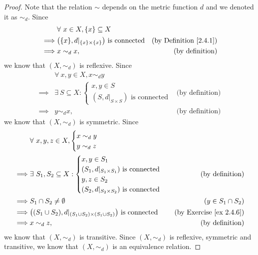 \begin{proof}
    Note that the relation \(\sim\) depends on the metric function \(d\) and we denoted it as \(\sim_d\).
    Since
    \begin{align*}
                 & \forall\ x \in X, \{x\} \subseteq X                                                                \\
        \implies & \big(\{x\}, d|_{\{x\} \times \{x\}}\big) \text{ is connected} & \text{(by Definition \ref{2.4.1})} \\
        \implies & x \sim_d x,                                                   & \text{(by definition)}
    \end{align*}
    we know that \((X, \sim_d)\) is reflexive.
    Since
    \begin{align*}
                 & \forall\ x, y \in X, x \sim_d y                                              \\
        \implies & \exists\ S \subseteq X : \begin{cases}
            x, y \in S \\
            (S, d|_{S \times S}) \text{ is connected}
        \end{cases} & \text{(by definition)} \\
        \implies & y \sim_d x,                                         & \text{(by definition)}
    \end{align*}
    we know that \((X, \sim_d)\) is symmetric.
    Since
    \begin{align*}
                 & \forall\ x, y, z \in X, \begin{cases}
            x \sim_d y \\
            y \sim_d z
        \end{cases}                                                                             \\
        \implies & \exists\ S_1, S_2 \subseteq X : \begin{cases}
            x, y \in S_1                                    \\
            (S_1, d|_{S_1 \times S_1}) \text{ is connected} \\
            y, z \in S_2                                    \\
            (S_2, d|_{S_2 \times S_2}) \text{ is connected}
        \end{cases}                               & \text{(by definition)}              \\
        \implies & S_1 \cap S_2 \neq \emptyset                                                              & (y \in S_1 \cap S_2)                \\
        \implies & \big((S_1 \cup S_2), d|_{(S_1 \cup S_2) \times (S_1 \cup S_2)}\big) \text{ is connected} & \text{(by Exercise \ref{ex 2.4.6})} \\
        \implies & x \sim_d z,                                                                              & \text{(by definition)}
    \end{align*}
    we know that \((X, \sim_d)\) is transitive.
    Since \((X, \sim_d)\) is reflexive, symmetric and transitive, we know that \((X, \sim_d)\) is an equivalence relation.


\end{proof}
